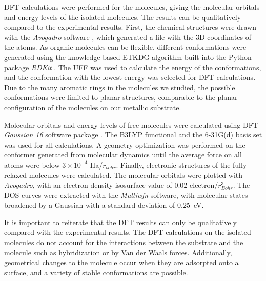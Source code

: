 \Acf{DFT} calculations were performed for the molecules, giving the molecular orbitals and energy levels of the isolated molecules. The results can be qualitatively compared to the experimental results. First, the chemical structures were drawn with the \textit{Avogadro} software \citep{hanwell2012avogadro}, which generated a file with the \ac{3D} coordinates of the atoms. As organic molecules can be flexible, different conformations were generated using the knowledge-based \ac{ETKDG} algorithm \citep{riniker2015better} built into the Python package \textit{RDKit} \citep{rdkit}. The \ac{UFF} \citep{rappe1992uff} was used to calculate the energy of the conformations, and the conformation with the lowest energy was selected for \ac{DFT} calculations. Due to the many aromatic rings in the molecules we studied, the possible conformations were limited to planar structures, comparable to the planar configuration of the molecules on our metallic substrate.

Molecular orbitals and energy levels of free molecules were calculated using \ac{DFT} \emph{Gaussian 16} software package \citep{frisch2016gaussian}. The \ac{B3LYP} functional \citep{lee1988development, becke1993becke} and the 6-31G(d) \citep{frisch1984self} basis set was used for all calculations. A geometry optimization was performed on the conformer generated from molecular dynamics until the average force on all atoms were below $3\times 10^{-4}$ Ha/$r_{bohr}$. Finally, electronic structures of the fully relaxed molecules were calculated. The molecular orbitals were plotted with \textit{Avogadro}, with an electron density isosurface value of 0.02 electron/$r_{Bohr}^3$. The \ac{DOS} curves were extracted with the \textit{Multiwfn} software, with molecular states broadened by a Gaussian with a standard deviation of \SI{0.25}{eV}.

It is important to reiterate that the \ac{DFT} results can only be qualitatively compared with the experimental results. The \ac{DFT} calculations on the isolated molecules do not account for the interactions between the substrate and the molecule such as hybridization or by Van der Waals forces. Additionally, geometrical changes to the molecule occur when they are adsorpted onto a surface, and a variety of stable conformations are possible.

